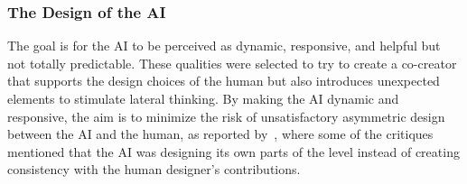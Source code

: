 
\subsubsection{The Design of the AI}





The goal is for the AI to be perceived as dynamic, responsive, and helpful but not totally predictable. These qualities were selected to try to create a co-creator that supports the design choices of the human but also introduces unexpected elements to stimulate lateral thinking. By making the AI dynamic and responsive, the aim is to minimize the risk of unsatisfactory asymmetric design between the AI and the human, as reported by~\cite{p13guzdial_co-creative_2018}, where some of the critiques mentioned that the AI was designing its own parts of the level instead of creating consistency with the human designer's contributions.


